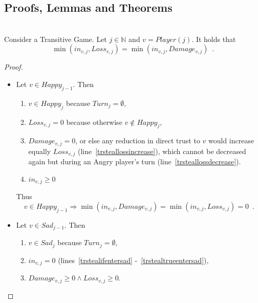 \documentclass[11pt]{llncs}
\theoremstyle{definition}
\begin{document}
    \subsection{Proofs, Lemmas and Theorems}
    \begin{lemma} \ \\
       Consider a Transitive Game. Let $j \in \mathbb{N}$ and $v = Player\left(j\right)$. It holds that
       \begin{equation*}
          \min\left(in_{v, j}, Loss_{v, j}\right) = \min\left(in_{v, j}, Damage_{v, j}\right) \enspace.
       \end{equation*}
    \end{lemma}
    \begin{proof} \ \\
       \begin{itemize}
          \item Let $v \in Happy_{j-1}$. Then
          \begin{enumerate}
             \item $v \in Happy_j$ because $Turn_{j} = \emptyset$,
             \item $Loss_{v, j} = 0$ because otherwise $v \notin Happy_j$,
             \item $Damage_{v, j} = 0$, or else any reduction in direct trust to $v$ would increase equally
             $Loss_{v, j}$ (line~\ref{trsteallossincrease}), which cannot be decreased again but during an Angry player's turn
             (line~\ref{trsteallossdecrease}).
             \item $in_{v, j} \geq 0$
          \end{enumerate}
          Thus
          \begin{equation*}
             v \in Happy_{j-1} \Rightarrow \min\left(in_{v, j}, Damage_{v,j}\right) = \min\left(in_{v, j}, Loss_{v,j}\right)
             = 0 \enspace.
          \end{equation*}
          \item Let $v \in Sad_{j-1}$. Then
          \begin{enumerate}
             \item $v \in Sad_j$ because $Turn_{j} = \emptyset$, 
             \item $in_{v, j} = 0$ (lines~\ref{trstealifentersad} -~\ref{trstealtrueentersad}),
             \item $Damage_{v, j} \geq 0 \wedge Loss_{v, j} \geq 0$.
          \end{enumerate}

\end{itemize}
\end{proof}
\end{document}
